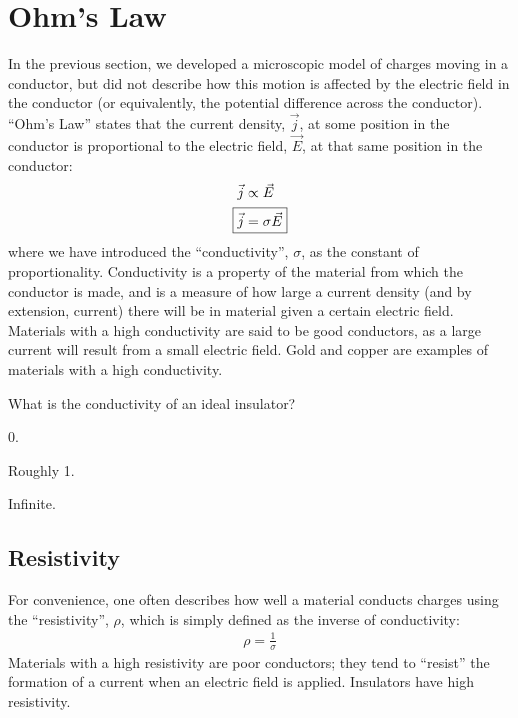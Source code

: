 \section{Ohm's Law}
In the previous section, we developed a microscopic model of charges moving in a conductor, but did not describe how this motion is affected by the electric field in the conductor (or equivalently, the potential difference across the conductor). ``Ohm's Law'' states that the current density, $\vec j$, at some position in the conductor is proportional to the electric field, $\vec E$, at that same position in the conductor:
\begin{align*}
\vec j &\propto \vec E\\
\Aboxed{\vec j &= \sigma \vec E}
\end{align*}
where we have introduced the ``conductivity'', $\sigma$, as the constant of proportionality. Conductivity is a property of the material from which the conductor is made, and is a measure of how large a current density (and by extension, current) there will be in material given a certain electric field. Materials with a high conductivity are said to be good conductors, as a large current will result from a small electric field. Gold and copper are examples of materials with a high conductivity.

\begin{checkpoint}
	\begin{MCquestion}{What is the conductivity of an ideal insulator?}
		\item 0. \correct
		\item Roughly 1.
		\item Infinite.
	\end{MCquestion}
\end{checkpoint}

\subsection{Resistivity}
For convenience, one often describes how well a material conducts charges using the ``resistivity'', $\rho$, which is simply defined as the inverse of conductivity:
\begin{align*}
\rho = \frac{1}{\sigma}
\end{align*}
Materials with a high resistivity are poor conductors; they tend to ``resist'' the formation of a current when an electric field is applied. Insulators have high resistivity.

